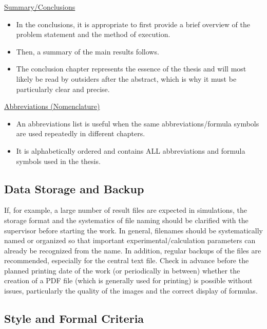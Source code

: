 \documentclass[a4paper, fleqn, headsepline, footsepline, 12pt, parskip=half]{scrartcl}
\begin{document}
\underline{Summary/Conclusions}

\begin{itemize}
    \item In the conclusions, it is appropriate to first provide a brief overview of the problem statement and the method of execution.
    \item Then, a summary of the main results follows.
    \item The conclusion chapter represents the essence of the thesis and will most likely be read by outsiders after the abstract, which is why it must be particularly clear and precise.
\end{itemize}

\underline{Abbreviations (Nomenclature)}

\begin{itemize}
    \item An abbreviations list is useful when the same abbreviations/formula symbols are used repeatedly in different chapters.
    \item It is alphabetically ordered and contains ALL abbreviations and formula symbols used in the thesis.
\end{itemize}


\subsection{Data Storage and Backup}
\label{sec:dataStorageAndBackup}

If, for example, a large number of result files are expected in simulations, the storage format and the systematics of file naming should be clarified with the supervisor before starting the work. In general, filenames should be systematically named or organized so that important experimental/calculation parameters can already be recognized from the name. In addition, regular backups of the files are recommended, especially for the central text file. Check in advance before the planned printing date of the work (or periodically in between) whether the creation of a PDF file (which is generally used for printing) is possible without issues, particularly the quality of the images and the correct display of formulas.


\subsection{Style and Formal Criteria}
\label{sec:styleAndFormalCriteria}
\end{document}
